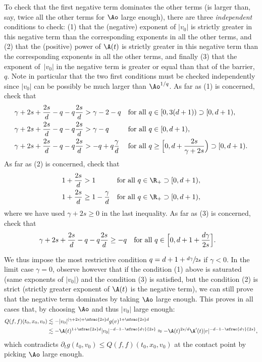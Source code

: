 To check that the first negative term dominates the other terms
(\ie is larger than, say, twice all the other terms for $\Ao$ large
enough), there are three \emph{independent} conditions to check: (1)
that the (negative) exponent of $|v_0|$ is strictly greater in this
negative term than the corresponding exponents in all the other terms,
and (2) that the (positive) power of $\A(t)$ is strictly greater in
this negative term than the corresponding exponents in all the other
terms, and finally (3) that the exponent of~$|v_0|$ in the negative
term is greater or equal than that of the barrier, \ie $q$. Note in
particular that the two first conditions must be checked independently since
$|v_0|$ can be possibly be much larger than $\Ao^{1/q}$. As far as (1)
is concerned, check that
\begin{align*}
\gamma + 2s + \frac{2s}{d} -q -q\frac{2s}{d}
& > \gamma - 2 - q
&& \text{for all $q \in [0,3(d+1)) \supset [0,d+1)$}, \\
\gamma + 2s + \frac{2s}{d} -q -q\frac{2s}{d}
& > \gamma - q
&& \text{for all $q \in [0,d+1)$}, \\
\gamma + 2s + \frac{2s}{d} -q -q\frac{2s}{d}
& > - q + q \frac{\gamma}{d}
&& \text{for all $q \ge \Bigl[0,d+\frac{2s}{\gamma+2s}\Bigr)
\supset [0,d+1)$}.
\end{align*}
As far as (2) is concerned, check that
\begin{align*}
1+\frac{2s}{d}
& > 1
&& \text{for all $q \in \R_+ \supset [0,d+1)$}, \\
1 + \frac{2s}{d}
& \ge 1- \frac{\gamma}{d}
&& \text{for all $q \in \R_+ \supset [0,d+1)$},
\end{align*}
where we have used $\gamma + 2s \ge 0$ in the last inequality. As far
as (3) is concerned, check that
\begin{align*}
\gamma + 2s + \frac{2s}{d} - q - q \frac{2s}{d}
& \ge -q
&& \text{for all $q \in \Bigl[0,d+1 + \frac{d\gamma}{2s}\Bigr]$.}
\end{align*}

We thus impose the most restrictive condition
$q = d+1 + \sfrac{d\gamma}{2s}$ if $\gamma <0$. In the limit case
$\gamma=0$, observe however that if the condition (1) above is
saturated (same exponents of $|v_0|$) and the condition (3) is
satisfied, but the condition (2) is strict (strictly greater exponent
of $\A(t)$ is the negative term), we can still prove that the negative
term dominates by taking $\Ao$ large enough. This proves in all cases
that, by choosing $\Ao$ and thus $|v_0|$ large enough:
\begin{align*}
Q(f,f)(t_0,x_0,v_0) &\lesssim -|v_0|^{(\gamma+2s)+\sfrac{2s}d} g(v)^{1+\sfrac{2s}d} \\
& \lesssim -\A(t)^{1+\sfrac{2s}d} |v_0|^{-d-1-\sfrac{d \gamma}{2s}} \approx -\A(t)^{2s/d} \A'(t) |v|^{-d-1-\sfrac{d\gamma}{2s}},
\end{align*}
which contradicts $\partial_t g(t_0,v_0) \le Q(f,f)(t_0,x_0,v_0)$ at
the contact point by picking $\Ao$ large enough.

